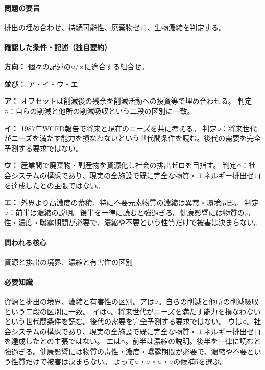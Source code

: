 \paragraph{問題の要旨} 排出の埋め合わせ、持続可能性、廃棄物ゼロ、生物濃縮を判定する。

\paragraph{確認した条件・記述（独自要約）}\mbox{}\par

\noindent\textbf{方向：} 個々の記述の○/×に適合する組合せ。\par

\noindent\textbf{並び：} ア・イ・ウ・エ\par

\noindent\textbf{ア：} オフセットは削減後の残余を削減活動への投資等で埋め合わせる。 判定○：自らの削減と他所の削減吸収という二段の区別に一致。\par

\noindent\textbf{イ：} 1987年WCED報告で将来と現在のニーズを共に考える。 判定○：将来世代がニーズを満たす能力を損なわないという世代間条件を読む。後代の需要を完全予測する要求ではない。\par

\noindent\textbf{ウ：} 産業間で廃棄物・副産物を資源化し社会の排出ゼロを目指す。 判定○：社会システムの構想であり、現実の全施設で既に完全な物質・エネルギー排出ゼロを達成したとの主張ではない。\par

\noindent\textbf{エ：} 外界より高濃度の蓄積、特に不要元素物質の濃縮は異常・環境問題。 判定○：前半は濃縮の説明。後半を一律に読むと強過ぎる。健康影響には物質の毒性・濃度・曝露期間が必要で、濃縮や不要という性質だけで被害は決まらない。\par

\paragraph{問われる核心} 資源と排出の境界、濃縮と有害性の区別

\paragraph{必要知識} 資源と排出の境界、濃縮と有害性の区別。アは○。自らの削減と他所の削減吸収という二段の区別に一致。 イは○。将来世代がニーズを満たす能力を損なわないという世代間条件を読む。後代の需要を完全予測する要求ではない。 ウは○。社会システムの構想であり、現実の全施設で既に完全な物質・エネルギー排出ゼロを達成したとの主張ではない。 エは○。前半は濃縮の説明。後半を一律に読むと強過ぎる。健康影響には物質の毒性・濃度・曝露期間が必要で、濃縮や不要という性質だけで被害は決まらない。 よって○・○・○・○の候補5を選ぶ。

